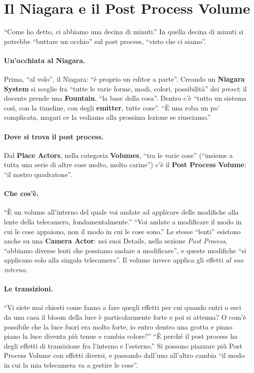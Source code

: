 \section{Il Niagara e il Post Process Volume}
\label{ue15:sec:postprocess}

``Come ho detto, ci abbiamo una decina di minuti.'' In quella decina di minuti si potrebbe
``buttare un occhio'' sul post process, ``visto che ci siamo''.

\paragraph{Un'occhiata al Niagara.} Prima, ``al volo'', il Niagara: ``è proprio un editor a
parte''. Creando un \textbf{Niagara System} si sceglie fra ``tutte le varie forme, modi, colori,
possibilità'' dei \emph{preset}; il docente prende una \textbf{Fountain}, ``la base della
cosa''. Dentro c'è ``tutto un sistema così, con la timeline, con degli \textbf{emitter}, tutte
cose''. ``È una roba un po' complicata, magari ce la vediamo alla prossima lezione se
riusciamo.''

\paragraph{Dove si trova il post process.} Dal \textbf{Place Actors}, nella categoria
\textbf{Volumes}, ``tra le varie cose'' (``insieme a tutta una serie di altre cose molto, molto
carine'') c'è il \textbf{Post Process Volume}: ``il nostro quadratone''.

\paragraph{Che cos'è.} ``È un volume all'interno del quale voi andate ad applicare delle
modifiche alla lente della telecamera, fondamentalmente.'' ``Voi andate a modificare il modo in
cui le cose appaiono, non il modo in cui le cose sono.'' Le stesse ``lenti'' esistono anche su
una \textbf{Camera Actor}: nei suoi Details, nella sezione \emph{Post Process}, ``abbiamo
diverse lenti che possiamo andare a modificare'', e queste modifiche ``si applicano solo alla
singola telecamera''. Il volume invece applica gli effetti \emph{al suo interno}.

\paragraph{Le transizioni.} ``Vi siete mai chiesti come fanno a fare quegli effetti per cui
quando entri o esci da una casa il bloom della luce è particolarmente forte e poi si attenua?
O com'è possibile che la luce fuori era molto forte, io entro dentro una grotta e piano piano
la luce diventa più tenue e cambia colore?'' ``È perché il post process ha degli effetti di
transizione fra l'interno e l'esterno.'' Si possono piazzare più Post Process Volume con
effetti diversi, e passando dall'uno all'altro cambia ``il modo in cui la mia telecamera va a
gestire le cose''.

